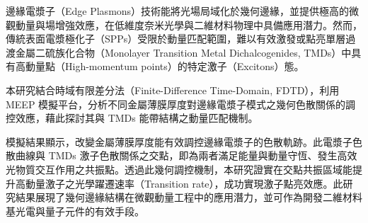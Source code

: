 
\begin{zhAbstract}

邊緣電漿子（Edge Plasmons）技術能將光場局域化於幾何邊緣，並提供極高的微觀動量與場增強效應，在低維度奈米光學與二維材料物理中具備應用潛力。然而，傳統表面電漿極化子（SPPs）受限於動量匹配範圍，難以有效激發或點亮單層過渡金屬二硫族化合物（Monolayer Transition Metal Dichalcogenides, TMDs）中具有高動量點（High-momentum points）的特定激子（Excitons）態。

本研究結合時域有限差分法（Finite-Difference Time-Domain, FDTD），利用 MEEP 模擬平台，分析不同金屬薄膜厚度對邊緣電漿子模式之幾何色散關係的調控效應，藉此探討其與 TMDs 能帶結構之動量匹配機制。

模擬結果顯示，改變金屬薄膜厚度能有效調控邊緣電漿子的色散軌跡。此電漿子色散曲線與 TMDs 激子色散關係之交點，即為兩者滿足能量與動量守恆、發生高效光物質交互作用之共振點。透過此幾何調控機制，本研究證實在交點共振區域能提升高動量激子之光學躍遷速率（Transition rate），成功實現激子點亮效應。此研究結果展現了幾何邊緣結構在微觀動量工程中的應用潛力，並可作為開發二維材料基光電與量子元件的有效手段。

    \zhAbsKeywords
\end{zhAbstract}
